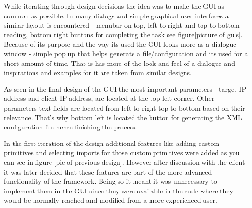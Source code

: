 While iterating through design decisions the idea was to make the GUI as common as possible. In many dialogs
and simple graphical user interfaces a similar layout is encountered - menubar on top, left to right and
top to bottom reading, bottom right buttons for completing the task see figure[picture of guis]. Because
of its purpose and the way its used the GUI looks more as a dialogue window - simple pop up that helps 
generate a file/configuration and its used for a short amount of time. That is has more of the look and feel of
a dialogue and inspirations and examples for it are taken from similar designs.

As seen in the final design of the GUI the most important parameters - target IP address and client IP address,
are located at the top left corner. Other parameters text fields are located from left  to right top to bottom
based on their relevance. That's why bottom left is located the button for generating the XML configuration
file hence finishing the process.

In the first iteration of the design additional features like adding custom primitives and selecting imports
for those custom primitives were added as you can see in figure [pic of previous design]. However after discussion with the client it was later
decided that these features are part of the more advanced functionality of the framework. Being so it meant
it was unnecessary to implement them in the GUI since they were available in the code where they would be 
normally reached and modified from a more experienced user.